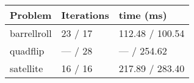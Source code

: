\begin{tabular}{lll}
\toprule 
Problem & Iterations & time (ms) \\
\midrule 
barrellroll & 23 / 17 & 112.48 / 100.54 \\
quadflip & — / 28 & — / 254.62 \\
satellite & 16 / 16 & 217.89 / 283.40 \\
\bottomrule 
\end{tabular}
